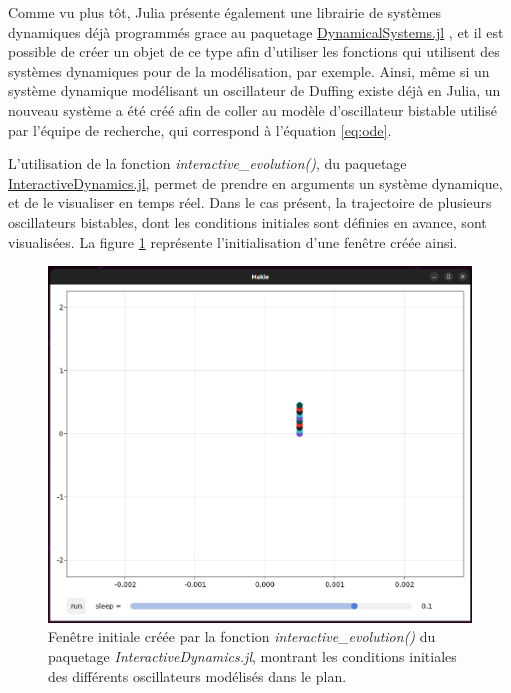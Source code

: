 \documentclass[a4paper, french, 12pt, titlepage]{article}
\begin{document}
Comme vu plus tôt, Julia présente également une librairie de systèmes dynamiques déjà programmés grace au paquetage \href{https://juliadynamics.github.io/DynamicalSystems.jl/latest/}{DynamicalSystems.jl} \cite{Datseris2018}, et il est possible de créer un objet de ce type afin d'utiliser les fonctions qui utilisent des systèmes dynamiques pour de la modélisation, par exemple.
Ainsi, même si un système dynamique modélisant un oscillateur de Duffing existe déjà en Julia, un nouveau système a été créé afin de coller au modèle d'oscillateur bistable utilisé par l'équipe de recherche, qui correspond à l'équation \ref{eq:ode}.

L'utilisation de la fonction \emph{interactive\_evolution()}, du paquetage \href{https://juliadynamics.github.io/InteractiveDynamics.jl/dev/}{InteractiveDynamics.jl}, permet de prendre en arguments un système dynamique, et de le visualiser en temps réel.
Dans le cas présent, la trajectoire de plusieurs oscillateurs bistables, dont les conditions initiales sont définies en avance, sont visualisées.
La figure \ref{fig:fig9} représente l'initialisation d'une fenêtre créée ainsi. 

\begin{figure}[H]
  \begin{center}
    \includegraphics[width=0.8\linewidth]{interactiveevolution_0.png}
    \caption{Fenêtre initiale créée par la fonction \emph{interactive\_evolution()} du paquetage \emph{InteractiveDynamics.jl}, montrant les conditions initiales des différents oscillateurs modélisés dans le plan.}
    \label{fig:fig9}
  \end{center}
\end{figure}
\end{document}
